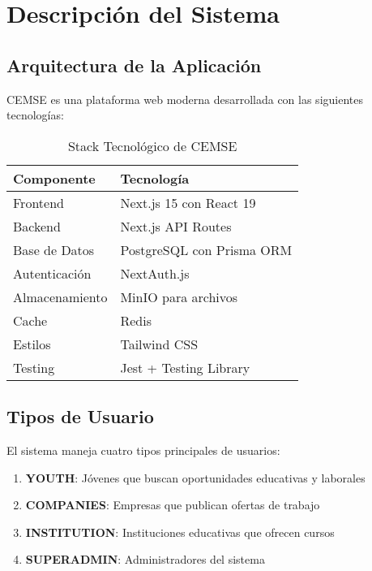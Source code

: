 \documentclass[12pt,a4paper]{article}
\begin{document}
\section{Descripción del Sistema}

\subsection{Arquitectura de la Aplicación}

CEMSE es una plataforma web moderna desarrollada con las siguientes tecnologías:

\begin{table}[H]
\centering
\caption{Stack Tecnológico de CEMSE}
\begin{tabular}{@{}ll@{}}
\toprule
\textbf{Componente} & \textbf{Tecnología} \\
\midrule
Frontend & Next.js 15 con React 19 \\
Backend & Next.js API Routes \\
Base de Datos & PostgreSQL con Prisma ORM \\
Autenticación & NextAuth.js \\
Almacenamiento & MinIO para archivos \\
Cache & Redis \\
Estilos & Tailwind CSS \\
Testing & Jest + Testing Library \\
\bottomrule
\end{tabular}
\end{table}

\subsection{Tipos de Usuario}

El sistema maneja cuatro tipos principales de usuarios:

\begin{enumerate}
    \item \textbf{YOUTH}: Jóvenes que buscan oportunidades educativas y laborales
    \item \textbf{COMPANIES}: Empresas que publican ofertas de trabajo
    \item \textbf{INSTITUTION}: Instituciones educativas que ofrecen cursos
    \item \textbf{SUPERADMIN}: Administradores del sistema
\end{enumerate}
\end{document}
